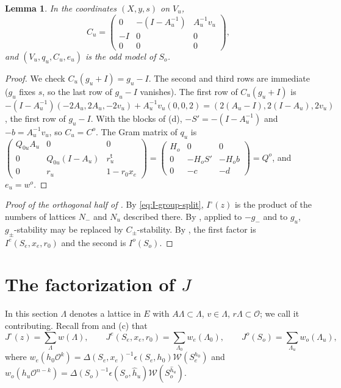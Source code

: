 \documentclass[11pt,oneside,notitlepage]{book}
\numberwithin{equation}{section}
\theoremstyle{plain}
\newtheorem{lemma}[theorem]{Lemma}
\theoremstyle{definition}
\newcommand{\cO}{\mathcal{O}}
\newcommand{\cW}{\mathcal{W}}
\begin{document}
\begin{lemma}\label{lem:Cu}
In the coordinates $(X,y,s)$ on $V_u$,
\[C_u=\begin{pmatrix}0&-(I-A_u^{-1})&A_u^{-1}v_u\\-I&0&0\\0&0&0\end{pmatrix},\]
and $(V_u,q_u,C_u,e_u)$ is the odd model of $S_o$.
\end{lemma}
\begin{proof}
We check $C_u(g_u+I)=g_u-I$. The second and third rows are immediate ($g_u$ fixes $s$, so the last row of $g_u-I$ vanishes). The first row of $C_u(g_u+I)$ is $-(I-A_u^{-1})(-2A_u,2A_u,-2v_u)+A_u^{-1}v_u(0,0,2)=(2(A_u-I),2(I-A_u),2v_u)$, the first row of $g_u-I$. With the blocks of (d), $-S'=-(I-A_u^{-1})$ and $-b=A_u^{-1}v_u$, so $C_u=C^o$. The Gram matrix of $q_u$ is $\left(\begin{smallmatrix}Q_{0u}A_u&0&0\\0&Q_{0u}(I-A_u)&r_u^{\mathsf t}\\0&r_u&1-r_0x_e\end{smallmatrix}\right)=\left(\begin{smallmatrix}H_o&0&0\\0&-H_oS'&-H_ob\\0&-c&-d\end{smallmatrix}\right)=Q^o$, and $e_u=w^o$.
\end{proof}

\begin{proof}[Proof of the orthogonal half of ]
By \eqref{eq:I-group-split}, $I^\circ(z)$ is the product of the numbers of lattices $N_-$ and $N_u$ described there. By , applied to $-g_-$ and to $g_u$, $g_\pm$-stability may be replaced by $C_\pm$-stability. By , the first factor is $I^e(S_e,x_e,r_0)$ and the second is $I^o(S_o)$.
\end{proof}

\section{The factorization of $J$}\label{sec:J}

In this section $\Lambda$ denotes a lattice in $E$ with $A\Lambda\subset\Lambda$, $v\in\Lambda$, $r\Lambda\subset\cO$; we call it contributing. Recall from  and (c) that
\[J^\circ(z)=\sum_\Lambda w(\Lambda),\qquad J^e(S_e,x_e,r_0)=\sum_{\Lambda_0}w_e(\Lambda_0),\qquad J^o(S_o)=\sum_{\Lambda_u}w_o(\Lambda_u),\]
where $w_e(h_0\cO^k)=\Delta(S_e,x_e)^{-1}\epsilon(S_e,h_0)\cW(S_e^{h_0})$ and $w_o(h_u\cO^{n-k})=\Delta(S_o)^{-1}\epsilon(S_o,\hat h_u)\cW(S_o^{\hat h_u})$.
\end{document}
